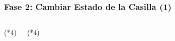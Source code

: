 \begin{frame}[fragile]
\frametitle{Fase 2: Cambiar Estado de la Casilla (1)} 
\begin{columns}
\begin{block}{(*4)}
\inputminted[linenos,fontsize=\tiny]{kotlin}{00_ComportamientoAplicacionTicTacToe/CambiarEstuatusCasilla.kt}
\end{block}

\begin{block}{(*4)}
\inputminted[linenos,fontsize=\tiny]{kotlin}{00_ComportamientoAplicacionTicTacToe/ActualizaEstatusTablero.kt}
\end{block}
\end{columns}
\end{frame}

